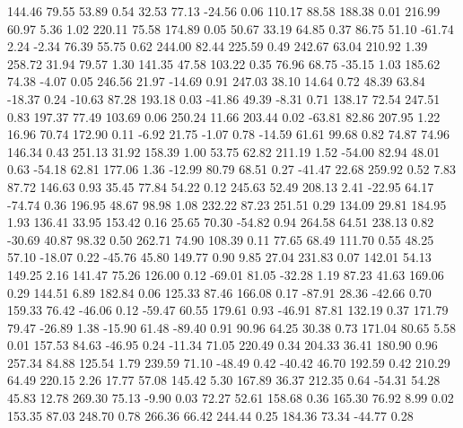  144.46   79.55   53.89    0.54
   32.53   77.13  -24.56    0.06
  110.17   88.58  188.38    0.01
  216.99   60.97    5.36    1.02
  220.11   75.58  174.89    0.05
   50.67   33.19   64.85    0.37
   86.75   51.10  -61.74    2.24
   -2.34   76.39   55.75    0.62
  244.00   82.44  225.59    0.49
  242.67   63.04  210.92    1.39
  258.72   31.94   79.57    1.30
  141.35   47.58  103.22    0.35
   76.96   68.75  -35.15    1.03
  185.62   74.38   -4.07    0.05
  246.56   21.97  -14.69    0.91
  247.03   38.10   14.64    0.72
   48.39   63.84  -18.37    0.24
  -10.63   87.28  193.18    0.03
  -41.86   49.39   -8.31    0.71
  138.17   72.54  247.51    0.83
  197.37   77.49  103.69    0.06
  250.24   11.66  203.44    0.02
  -63.81   82.86  207.95    1.22
   16.96   70.74  172.90    0.11
   -6.92   21.75   -1.07    0.78
  -14.59   61.61   99.68    0.82
   74.87   74.96  146.34    0.43
  251.13   31.92  158.39    1.00
   53.75   62.82  211.19    1.52
  -54.00   82.94   48.01    0.63
  -54.18   62.81  177.06    1.36
  -12.99   80.79   68.51    0.27
  -41.47   22.68  259.92    0.52
    7.83   87.72  146.63    0.93
   35.45   77.84   54.22    0.12
  245.63   52.49  208.13    2.41
  -22.95   64.17  -74.74    0.36
  196.95   48.67   98.98    1.08
  232.22   87.23  251.51    0.29
  134.09   29.81  184.95    1.93
  136.41   33.95  153.42    0.16
   25.65   70.30  -54.82    0.94
  264.58   64.51  238.13    0.82
  -30.69   40.87   98.32    0.50
  262.71   74.90  108.39    0.11
   77.65   68.49  111.70    0.55
   48.25   57.10  -18.07    0.22
  -45.76   45.80  149.77    0.90
    9.85   27.04  231.83    0.07
  142.01   54.13  149.25    2.16
  141.47   75.26  126.00    0.12
  -69.01   81.05  -32.28    1.19
   87.23   41.63  169.06    0.29
  144.51    6.89  182.84    0.06
  125.33   87.46  166.08    0.17
  -87.91   28.36  -42.66    0.70
  159.33   76.42  -46.06    0.12
  -59.47   60.55  179.61    0.93
  -46.91   87.81  132.19    0.37
  171.79   79.47  -26.89    1.38
  -15.90   61.48  -89.40    0.91
   90.96   64.25   30.38    0.73
  171.04   80.65    5.58    0.01
  157.53   84.63  -46.95    0.24
  -11.34   71.05  220.49    0.34
  204.33   36.41  180.90    0.96
  257.34   84.88  125.54    1.79
  239.59   71.10  -48.49    0.42
  -40.42   46.70  192.59    0.42
  210.29   64.49  220.15    2.26
   17.77   57.08  145.42    5.30
  167.89   36.37  212.35    0.64
  -54.31   54.28   45.83   12.78
  269.30   75.13   -9.90    0.03
   72.27   52.61  158.68    0.36
  165.30   76.92    8.99    0.02
  153.35   87.03  248.70    0.78
  266.36   66.42  244.44    0.25
  184.36   73.34  -44.77    0.28
